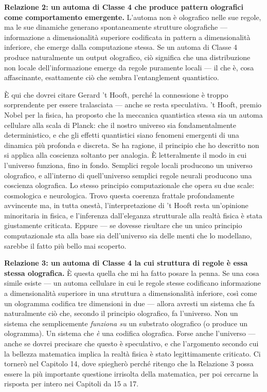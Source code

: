 \documentclass[11pt, twoside, openright]{book}
\begin{document}
\textbf{Relazione 2: un automa di Classe 4 che produce pattern olografici come comportamento emergente.} L'automa non è olografico nelle sue regole, ma le sue dinamiche generano spontaneamente strutture olografiche --- informazione a dimensionalità superiore codificata in pattern a dimensionalità inferiore, che emerge dalla computazione stessa. Se un automa di Classe 4 produce naturalmente un output olografico, ciò significa che una distribuzione non locale dell'informazione emerge da regole puramente locali --- il che è, cosa affascinante, esattamente ciò che sembra l'entanglement quantistico.

È qui che dovrei citare Gerard 't Hooft, perché la connessione è troppo sorprendente per essere tralasciata --- anche se resta speculativa. 't Hooft, premio Nobel per la fisica, ha proposto che la meccanica quantistica stessa sia un automa cellulare alla scala di Planck: che il nostro universo sia fondamentalmente deterministico, e che gli effetti quantistici siano fenomeni emergenti di una dinamica più profonda e discreta. Se ha ragione, il principio che ho descritto non si applica alla coscienza soltanto per analogia. È letteralmente il modo in cui l'universo funziona, fino in fondo. Semplici regole locali producono un universo olografico, e all'interno di quell'universo semplici regole neurali producono una coscienza olografica. Lo stesso principio computazionale che opera su due scale: cosmologica e neurologica. Trovo questa coerenza frattale profondamente avvincente ma, in tutta onestà, l'interpretazione di 't Hooft resta un'opinione minoritaria in fisica, e l'inferenza dall'eleganza strutturale alla realtà fisica è stata giustamente criticata. Eppure --- se dovesse risultare che un unico principio computazionale sta alla base sia dell'universo sia delle menti che lo modellano, sarebbe il fatto più bello mai scoperto.

\textbf{Relazione 3: un automa di Classe 4 la cui struttura di regole è essa stessa olografica.} È questa quella che mi ha fatto posare la penna. Se una cosa simile esiste --- un automa cellulare in cui le regole stesse codificano informazione a dimensionalità superiore in una struttura a dimensionalità inferiore, così come un ologramma codifica tre dimensioni in due --- allora avresti un sistema che fa naturalmente ciò che, secondo il principio olografico, fa l'universo. Non un sistema che semplicemente \textit{funziona su} un substrato olografico (o produce un ologramma). Un sistema che \textit{è} una codifica olografica. Forse anche l'universo --- anche se dovrei precisare che questo è speculativo, e che l'argomento secondo cui la bellezza matematica implica la realtà fisica è stato legittimamente criticato. Ci tornerò nel Capitolo 14, dove spiegherò perché ritengo che la Relazione 3 possa essere la più importante questione irrisolta della matematica, per poi cercarne la risposta per intero nei Capitoli da 15 a 17.
\end{document}
